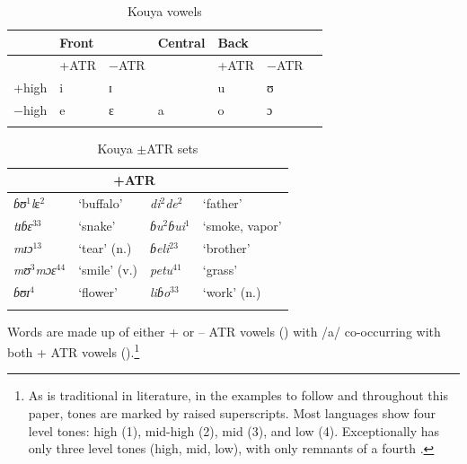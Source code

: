 \documentclass[output=paper,newtxmath,modfonts,nonflat,draft]{langsci/langscibook}
\begin{document}
\begin{table}[t]
\begin{tabular}{lllllll}
\lsptoprule
& Front   &&   Central &   Back &\\
\midrule
& +ATR & −ATR   &   &  +ATR & −ATR\\

+high  &  i &	ɪ    &&   u  &  ʊ\\

−high  &  e & ɛ  &  a  &  o & ɔ\\
\lspbottomrule
\end{tabular}  
\caption{Kouya vowels}
\label{tab:zogbo:1}
\end{table}
\begin{table}[t]

\caption{Kouya $\pm$ATR sets}     \label{tab:zogbo:2a}
\begin{tabular}{llll}

\lsptoprule
\multicolumn{2}{c}{−ATR} & \multicolumn{2}{c}{+ATR}\\
\midrule
\textit{ɓʊ}{$^1$}\textit{l}ɛ$^2$ &     {‘buffalo’} & \textit{di}$^2$\textit{de}$^2$ & {‘father’}\\

\textit{tɪɓɛ}$^{33}$  &  ‘snake’   &   \textit{ɓu}$^2$\textit{ɓui}$^1$ & {‘smoke,  vapor’}\\

\textit{mɪɔ}$^{13}$  &  ‘tear’ (n.) &    \textit{ɓeli}$^{23}$  &  ‘brother’ \\

\textit{m{ʊ}}{$^3$}\textit{{m}ɔɛ}$^{44}$ & ‘smile’ (v.)  &  \textit{petu}$^{41}$  &  ‘grass’ \\

\textit{ɓʊɪ}$^4$ & ‘flower’  &  \textit{liɓo}$^{33}$    & ‘work’ (n.) \\
\lspbottomrule
\end{tabular}
\end{table}
 Words are made up of either + or – ATR vowels () with /a/ co-occurring with both + ATR vowels ().\footnote{As is traditional in  literature, in the examples to follow and throughout this paper, tones are marked by raised superscripts. Most  languages show four level tones: high (1), mid-high (2), mid (3), and low (4).  Exceptionally  has only three level tones (high, mid, low), with only remnants of a fourth  \citep{Gratrix1975}.} 
\clearpage 
\end{document}
